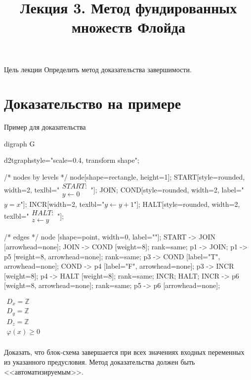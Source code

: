 \documentclass[hyperref={unicode=true}]{beamer}
\title{Лекция 3. Метод фундированных множеств Флойда}
\author{}
\date{}
\begin{document}
	\begin{frame}{}
		\titlepage
	\end{frame}

    \begin{frame}{Цель лекции}
    Определить метод доказательства завершимости.
    \end{frame}

    \section{Доказательство на примере}

	\begin{frame}[fragile]{Пример для доказательства}
	\begin{multicols}{2}
	
	\huge
	\begin{dot2tex}[options=-traw]
	digraph G{
		d2tgraphstyle="scale=0.4, transform shape";
		
		/* nodes by levels */
		node[shape=rectangle, height=1];
		START[style=rounded, width=2, texlbl="$\begin{matrix}START:\\ y \leftarrow 0\end{matrix}$"];
		JOIN;
        COND[style=rounded, width=2, label="$y = x$"];
		INCR[width=2, texlbl="$y \leftarrow y + 1$"];
        HALT[style=rounded, width=2, texlbl="$\begin{matrix}HALT:\\  z \leftarrow y\end{matrix}$"];
				
		/* edges */
		node [shape=point, width=0, label=""];
		START -> JOIN [arrowhead=none]; JOIN -> COND [weight=8];
		{ rank=same; p1 -> JOIN; }
		p1 -> p5 [weight=8, arrowhead=none];
		{ rank=same; p3 -> COND [label="T", arrowhead=none]; COND -> p4 [label="F", arrowhead=none]; }
		p3 -> INCR [weight=8];
		p4 -> HALT [weight=8];
		{ rank=same; INCR; HALT; }
		INCR -> p6 [weight=8, arrowhead=none];
		{ rank=same; p5 -> p6 [arrowhead=none]; }
	}
	\end{dot2tex}
	
	\normalsize
	
    $\begin{matrix}
    D_x = \mathbb{Z}\\
    D_y = \mathbb{Z}\\
    D_z = \mathbb{Z}\\
    \varphi(x) \geq 0\\
    \end{matrix}$

    Доказать, что блок-схема завершается при всех значениях входных переменных из указанного предусловия. Метод доказательства должен быть <<автоматизируемым>>.
	\end{multicols}

	\end{frame}
   
\end{document}
